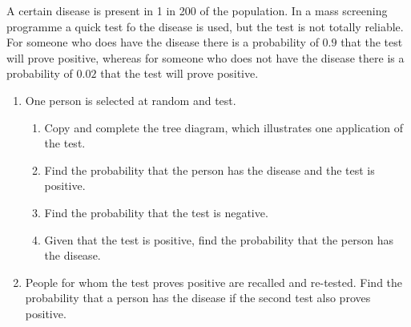 \begin{problem}
    A certain disease is present in 1 in 200 of the population. In a mass screening programme a quick test fo the disease is used, but the test is not totally reliable. For someone who does have the disease there is a probability of $0.9$ that the test will prove positive, whereas for someone who does not have the disease there is a probability of $0.02$ that the test will prove positive.
    \begin{center}
    \end{center}
    \begin{enumerate}
        \item One person is selected at random and test.
        \begin{enumerate}
            \item Copy and complete the tree diagram, which illustrates one application of the test.
            \item Find the probability that the person has the disease and the test is positive.
            \item Find the probability that the test is negative.
            \item Given that the test is positive, find the probability that the person has the disease.
        \end{enumerate}
        \item People for whom the test proves positive are recalled and re-tested. Find the probability that a person has the disease if the second test also proves positive.
    \end{enumerate}
\end{problem}
\clearpage
